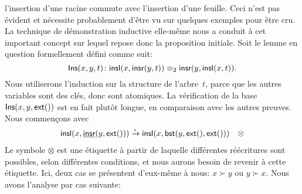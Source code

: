 l'insertion d'une racine commute avec l'insertion d'une feuille. Ceci
n'est pas évident et nécessite probablement d'être vu sur quelques
exemples pour être cru. La technique de démonstration inductive
elle-même nous a conduit à cet important concept sur lequel repose
donc la proposition initiale. Soit le lemme en question formellement
défini comme suit:
\begin{equation*}
\pred{Ins}{x,y,t} \colon \fun{insl}(x,\fun{insr}(y,t))
\equiv_2 \fun{insr}(y,\fun{insl}(x,t)).
\index{Ins@\predName{Ins}}
\end{equation*}
Nous utiliserons l'induction sur la structure de l'arbre~\(t\), parce
que les autres variables sont des clés, donc sont atomiques. La
vérification de la base \(\textsf{Ins}({x,y,\textsf{ext}()})\) est en fait
plutôt longue, en comparaison avec les autres preuves. Nous
commençons avec
\begin{equation*}
\begin{array}{@{}r@{\;}l@{\;}l@{\quad}r@{}}
  \fun{insl}(x,\ufun{insr}(y,\fun{ext}()))
& \xrightarrow{\smash{\iota}} &
  \fun{insl}(x,\fun{bst}(y,\fun{ext}(),\fun{ext}())) & \otimes
\end{array}
\end{equation*}
Le symbole \(\otimes\) est une étiquette à partir de laquelle
différentes réécritures sont possibles, selon différentes conditions,
et nous aurons besoin de revenir à cette étiquette. Ici, deux cas se
présentent d'eux-même à nous: \(x \succ y\) ou \(y \succ x\). Nous
avons l'analyse par cas suivante:
